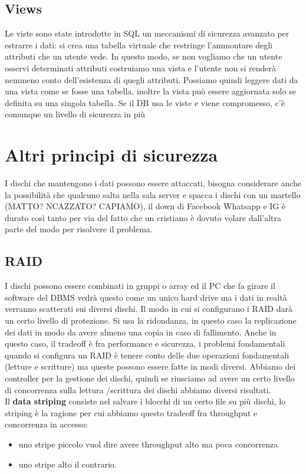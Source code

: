 \documentclass[12pt, oneside]{extbook} %
\begin{document}
\subsection{Views}
Le viste sono state introdotte in SQL un meccanismi di sicurezza avanzato per estrarre i dati: si crea una tabella virtuale che restringe l'ammontare degli attributi che un utente vede. In questo modo, se non vogliamo che un utente osservi determinati attributi costruiamo una vista e l'utente non si renderà nemmeno conto dell'esistenza di quegli attributi. Possiamo quindi leggere dati da una vista come se fosse una tabella, inoltre la vista può essere aggiornata solo se definita su una singola tabella. Se il DB usa le viste e viene compromesso, c'è comunque un livello di sicurezza in più
\section{Altri principi di sicurezza}
I dischi che mantengono i dati possono essere attaccati, bisogna considerare anche la possibilità che qualcuno salta nella sala server e spacca i dischi con un martello (MATTO? NCAZZATO? CAPIAMO), il down di Facebook Whatsapp e IG è durato così tanto per via del fatto che un cristiano è dovuto volare dall'altra parte del modo per risolvere il problema.
\subsection{RAID}
I dischi possono essere combinati in gruppi o array ed il PC che fa girare il software del DBMS vedrà questo come un unico hard drive ma i dati in realtà verranno scatterati sui diversi dischi. Il modo in cui si configurano i RAID darà un certo livello di protezione. Si usa la ridondanza, in questo caso la replicazione dei dati in modo da avere almeno una copia in caso di fallimento. Anche in questo caso, il tradeoff è fra performance e sicurezza, i problemi fondamentali quando si configura un RAID è tenere conto delle due operazioni fondamentali (letture e scritture) ma queste possono essere fatte in modi diversi. Abbiamo dei controller per la gestione dei dischi, quindi se riusciamo ad avere un certo livello di concorrenza sulla lettura /scrittura dei dischi abbiamo diversi risultati.\\Il \textbf{data striping} consiste nel salvare i blocchi di un certo file su più dischi, lo striping è la ragione per cui abbiamo questo tradeoff fra throughput e concorrenza in accesso:
\begin{itemize}
	\item uno stripe piccolo vuol dire avere throughput alto ma poca concorrenza
	\item uno stripe alto il contrario.
\end{itemize}
\end{document}
